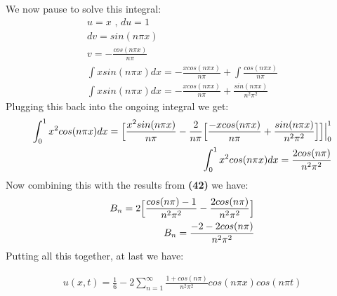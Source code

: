 \documentclass{article}
\begin{document}
We now pause to solve this integral:
\begin{equation}
\begin{aligned}
u = x \text{ , } du = 1\\
dv = sin(n\pi x)\\
v = -\frac{cos(n\pi x)}{n\pi}\\
\int xsin(n\pi x)dx = -\frac{xcos(n\pi x)}{n\pi} + \int \frac{cos(n\pi x)}{n\pi}\\
\int xsin(n\pi x)dx =  -\frac{xcos(n\pi x)}{n\pi} + \frac{sin(n\pi x)}{n^2\pi^2}
\end{aligned}
\end{equation}
Plugging this back into the ongoing integral we get:
\begin{equation}
\begin{aligned}
\int_0^1x^2cos(n\pi x)dx = \Big{[}\frac{x^2sin(n\pi x)}{n\pi} - \frac{2}{n\pi}\Big{[}\frac{-xcos(n\pi x)}{n\pi} + \frac{sin(n\pi x)}{n^2\pi^2} \Big{]}\Big{]}\Big{|}_0^1\\
\int_0^1x^2cos(n\pi x)dx = \frac{2cos(n\pi)}{n^2\pi^2}
\end{aligned}
\end{equation}
Now combining this with the results from \textbf{(42)} we have:
\begin{equation}
\begin{aligned}
B_n = 2 \Big{[}\frac{cos(n\pi) - 1}{n^2\pi^2} - \frac{2cos(n\pi)}{n^2\pi^2}\Big{]}\\
B_n = \frac{-2 -2cos(n\pi)}{n^2\pi^2}
\end{aligned}
\end{equation}
Putting all this together, at last we have:
\begin{tcolorbox}[minipage,colback=white,arc=0pt,outer arc=0pt]
\begin{equation}
\begin{aligned}
u(x,t)=\frac{1}{6} - 2\sum_{n=1}^{\infty}\frac{1 +cos(n\pi)}{n^2\pi^2}cos(n\pi x)cos(n\pi t)
\end{aligned}
\end{equation}
\end{tcolorbox}
\end{document}
